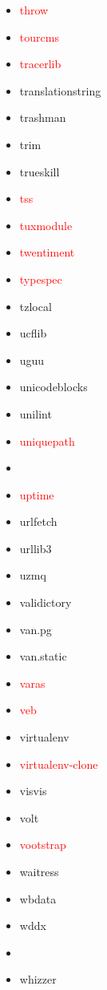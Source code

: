 \documentclass{l4proj}
\begin{document}
\begin{appendices}
{\begin{itemize}
\item\textcolor{red}{throw}
\item\textcolor{red}{tourcms}
\end{itemize}
}%
\clearpage
\noindent\parbox[t]{0.32\textwidth}{\raggedright%
\begin{itemize}
\item\textcolor{red}{tracerlib}
\item translationstring
\item trashman
\item trim
\item trueskill
\item\textcolor{red}{tss}
\item\textcolor{red}{tuxmodule}
\item\textcolor{red}{twentiment}
\item\textcolor{red}{typespec}
\item tzlocal
\item ucflib
\item uguu
\item unicodeblocks
\item unilint
\item\textcolor{red}{uniquepath}
\item {}
\item\textcolor{red}{uptime}
\item urlfetch
\item urllib3
\item uzmq
\item validictory
\item van.pg
\item van.static
\item\textcolor{red}{varas}
\item\textcolor{red}{veb}
\item virtualenv
\item\textcolor{red}{virtualenv-clone}
\item visvis
\item volt
\end{itemize}
}%
\noindent\parbox[t]{0.32\textwidth}{\raggedright%
\begin{itemize}
\item\textcolor{red}{vootstrap}
\item waitress
\item wbdata
\item wddx
\item\textcolor{red}{}
\item whizzer

\end{itemize}}
\end{appendices}
\end{document}
